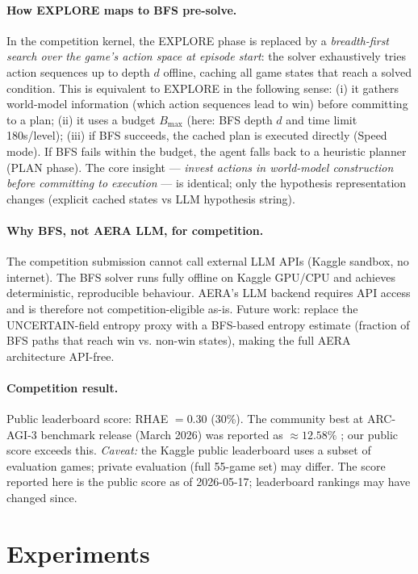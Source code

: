 \documentclass[11pt]{article}
\begin{document}
\paragraph{How EXPLORE maps to BFS pre-solve.} In the competition kernel, the EXPLORE phase is replaced by a \emph{breadth-first search over the game's action space at episode start}: the solver exhaustively tries action sequences up to depth $d$ offline, caching all game states that reach a solved condition. This is equivalent to EXPLORE in the following sense: (i) it gathers world-model information (which action sequences lead to win) before committing to a plan; (ii) it uses a budget $B_{\max}$ (here: BFS depth $d$ and time limit 180s/level); (iii) if BFS succeeds, the cached plan is executed directly (Speed mode). If BFS fails within the budget, the agent falls back to a heuristic planner (PLAN phase). The core insight — \emph{invest actions in world-model construction before committing to execution} — is identical; only the hypothesis representation changes (explicit cached states vs LLM hypothesis string).

\paragraph{Why BFS, not AERA LLM, for competition.} The competition submission cannot call external LLM APIs (Kaggle sandbox, no internet). The BFS solver runs fully offline on Kaggle GPU/CPU and achieves deterministic, reproducible behaviour. AERA's LLM backend requires API access and is therefore not competition-eligible as-is. Future work: replace the UNCERTAIN-field entropy proxy with a BFS-based entropy estimate (fraction of BFS paths that reach win vs. non-win states), making the full AERA architecture API-free.

\paragraph{Competition result.} Public leaderboard score: RHAE $= 0.30$ (30\%). The community best at ARC-AGI-3 benchmark release (March 2026) was reported as $\approx 12.58\%$ \cite{arcprize2026}; our public score exceeds this. \emph{Caveat:} the Kaggle public leaderboard uses a subset of evaluation games; private evaluation (full 55-game set) may differ. The score reported here is the public score as of 2026-05-17; leaderboard rankings may have changed since.

\section{Experiments}
\label{sec:experiments}
\end{document}
